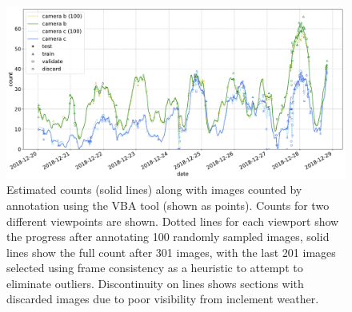 \begin{figure}[ht]
    \centering
    \includegraphics[width=1.0\linewidth]{charts/seals/scott_base_combined.pdf}
    \caption{Estimated counts (solid lines) along with images counted by annotation using the \gls{VBA} tool (shown as points). Counts for two different viewpoints are shown. Dotted lines for each viewport show the progress after annotating 100 randomly sampled images, solid lines show the full count after 301 images, with the last 201 images selected using frame consistency as a heuristic to attempt to eliminate outliers. Discontinuity on lines shows sections with discarded images due to poor visibility from inclement weather. }
    \label{fig:scott_base}
\end{figure}
